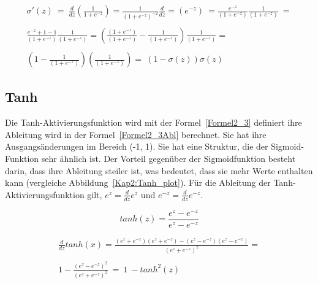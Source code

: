 \begin{equation} \label{Formel2_2Abl}
    \begin{array}{ c }
        \sigma '(z)\ =\ \frac{d}{dz}\left(\frac{1}{1+e^{-z}}\right) =\frac{1}{\left( 1+e^{-z}\right)^{-2}}\frac{d}{dz} =\left( e^{-z}\right) \ =\frac{e^{-z}}{\left( 1+e^{-z}\right)}\frac{1}{\left( 1+e^{-z}\right)} \ =  \\
        \\
        \frac{e^{-z} +1-1}{\left( 1+e^{-z}\right)}\frac{1}{\left( 1+e^{-z}\right)} =\left(\frac{\left( 1+e^{-z}\right)}{\left( 1+e^{-z}\right)} -\frac{1}{\left( 1+e^{-z}\right)}\right)\frac{1}{\left( 1+e^{-z}\right)} = \\
        \\
        \left( 1-\frac{1}{\left( 1+e^{-z}\right)}\right)\left(\frac{1}{\left( 1+e^{-z}\right)}\right) =\ (1-\sigma (z))\sigma (z)
    \end{array}
\end{equation}

\subsection{Tanh}
Die Tanh-Aktivierungsfunktion wird mit der Formel~\ref{Formel2_3} definiert ihre Ableitung wird in der Formel~\ref{Formel2_3Abl} berechnet. Sie hat ihre Ausgangsänderungen im Bereich (-1, 1). Sie hat eine Struktur, die der Sigmoid-Funktion sehr ähnlich ist. Der Vorteil gegenüber der Sigmoidfunktion besteht darin, dass ihre Ableitung steiler ist, was bedeutet, dass sie mehr Werte enthalten kann (vergleiche Abbildung~\ref{Kap2:Tanh_plot}). Für die Ableitung der Tanh-Aktivierungsfunktion gilt, $e^z = \frac{d}{dz}e^z$ und $e^{-z} = \frac{d}{dz}e^{-z}$.

\begin{equation} \label{Formel2_3}
    tanh(z) = \frac{e^{z}-e^{-z}}{e^{z}-e^{-z}}
\end{equation}

\begin{equation} \label{Formel2_3Abl}
    \begin{array}{ c }
        \frac{d}{dz} tanh( x) =\frac{\left( e^{z} +e^{-z}\right)\left( e^{z} +e^{-z}\right) -\left( e^{z} -e^{-z}\right)\left( e^{z} -e^{-z}\right)}{\left( e^{z} +e^{-z}\right)^{2}} = \\
        \\
        1-\frac{\left( e^{z} -e^{-z}\right)^{2}}{\left( e^{z} +e^{-z}\right)^{2}} \ =\ 1\ -tanh^{2}( z)
    \end{array}
\end{equation}

